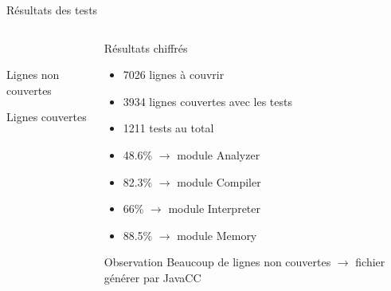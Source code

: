 
\begin{frame}{Résultats des tests}
    \begin{columns}
        \begin{column}{0.5\textwidth}
             \\ 
             Lignes non couvertes \\
             Lignes couvertes
        \end{column}
        \begin{column}{0.5\textwidth}
            \vspace{-10mm}
            \begin{block}{Résultats chiffrés}
                \begin{itemize}
                    \item 7026 lignes à couvrir
                    \item 3934 lignes couvertes avec les tests
                    \item 1211 tests au total
                    \item 48.6\% $\rightarrow$ module Analyzer
                    \item 82.3\% $\rightarrow$ module Compiler
                    \item 66\% $\rightarrow$ module Interpreter
                    \item 88.5\% $\rightarrow$ module Memory 
                \end{itemize}    
            \end{block}

            \begin{block}{Observation}
                Beaucoup de lignes non couvertes $\rightarrow$ fichier générer par JavaCC 
            \end{block}
        \end{column}
    \end{columns}
\end{frame}